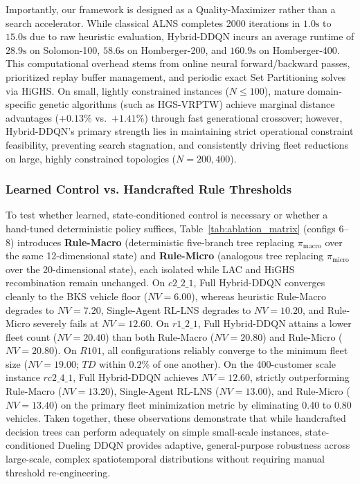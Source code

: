 \documentclass{ieeeaccess}
\begin{document}
Importantly, our framework is designed as a Quality-Maximizer rather than a search accelerator. While classical ALNS completes 2000 iterations in $1.0\text{s}$ to $15.0\text{s}$ due to raw heuristic evaluation, Hybrid-DDQN incurs an average runtime of $28.9\text{s}$ on Solomon-100, $58.6\text{s}$ on Homberger-200, and $160.9\text{s}$ on Homberger-400. This computational overhead stems from online neural forward/backward passes, prioritized replay buffer management, and periodic exact Set Partitioning solves via HiGHS. On small, lightly constrained instances ($N \le 100$), mature domain-specific genetic algorithms (such as HGS-VRPTW) achieve marginal distance advantages ($+0.13\%$ vs.\ $+1.41\%$) through fast generational crossover; however, Hybrid-DDQN's primary strength lies in maintaining strict operational constraint feasibility, preventing search stagnation, and consistently driving fleet reductions on large, highly constrained topologies ($N=200, 400$).

\subsubsection{Learned Control vs. Handcrafted Rule Thresholds}
\label{sec:disc_rule_vs_learned}
To test whether learned, state-conditioned control is necessary or whether a hand-tuned deterministic policy suffices, Table~\ref{tab:ablation_matrix} (configs 6--8) introduces \textbf{Rule-Macro} (deterministic five-branch tree replacing $\pi_{\text{macro}}$ over the same 12-dimensional state) and \textbf{Rule-Micro} (analogous tree replacing $\pi_{\text{micro}}$ over the 20-dimensional state), each isolated while LAC and HiGHS recombination remain unchanged. On $c2\_2\_1$, Full Hybrid-DDQN converges cleanly to the BKS vehicle floor ($NV=6.00$), whereas heuristic Rule-Macro degrades to $NV=7.20$, Single-Agent RL-LNS degrades to $NV=10.20$, and Rule-Micro severely fails at $NV=12.60$. On $r1\_2\_1$, Full Hybrid-DDQN attains a lower fleet count ($NV=20.40$) than both Rule-Macro ($NV=20.80$) and Rule-Micro ($NV=20.80$). On $R101$, all configurations reliably converge to the minimum fleet size ($NV=19.00$; $TD$ within $0.2\%$ of one another). On the 400-customer scale instance $rc2\_4\_1$, Full Hybrid-DDQN achieves $NV=12.60$, strictly outperforming Rule-Macro ($NV=13.20$), Single-Agent RL-LNS ($NV=13.00$), and Rule-Micro ($NV=13.40$) on the primary fleet minimization metric by eliminating 0.40 to 0.80 vehicles. Taken together, these observations demonstrate that while handcrafted decision trees can perform adequately on simple small-scale instances, state-conditioned Dueling DDQN provides adaptive, general-purpose robustness across large-scale, complex spatiotemporal distributions without requiring manual threshold re-engineering.
\end{document}
